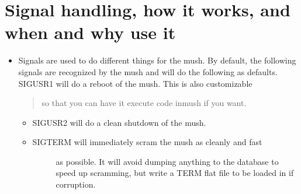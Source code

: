 \documentclass[letterpaper,10pt,english]{sphinxmanual}
\begin{document}
\section{Signal handling, how it works, and when and why use it}
\label{\detokenize{12-advanced:signal-handling-how-it-works-and-when-and-why-use-it}}\begin{itemize}
\item {} 
\sphinxAtStartPar
Signals are used to do different things for the mush.  By default,
the following signals are recognized by the mush and will do
the following as defaults.
\sphinxhyphen{} SIGUSR1 \sphinxhyphen{} will do a reboot of the mush.  This is also customizable
\begin{quote}

\sphinxAtStartPar
so that you can have it execute code in\sphinxhyphen{}mush if you want.
\end{quote}
\begin{itemize}
\item {} 
\sphinxAtStartPar
SIGUSR2 \sphinxhyphen{} will do a clean shutdown of the mush.

\item {} \begin{description}
\item[{SIGTERM \sphinxhyphen{} will immediately scram the mush as cleanly and fast}] \leavevmode
\sphinxAtStartPar
as possible.  It will avoid dumping anything to
the database to speed up scramming, but write
a TERM flat file to be loaded in if corruption.

\end{description}

\end{itemize}

\end{itemize}
\end{document}
